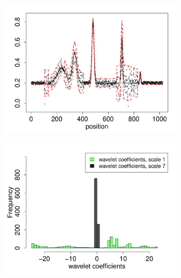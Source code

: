 \documentclass[12pt]{article}
\begin{document}
\begin{figure}
\centering
    \begin{subfigure}[b]{0.48\textwidth}
        \centering
        \includegraphics[width=\textwidth]{simple_eg_1.pdf}
        \caption{}
        \label{fig:simple_eg_1}
    \end{subfigure}
		\hfill
    \begin{subfigure}[b]{0.48\textwidth}
        \centering
        \includegraphics[width=\textwidth]{simple_eg_2.pdf}
        \caption{}
        \label{fig:simple_eg_2}
    \end{subfigure}
		\hfill
    \begin{subfigure}[b]{0.48\textwidth}
        \centering

\end{subfigure}
\end{figure}
\end{document}
